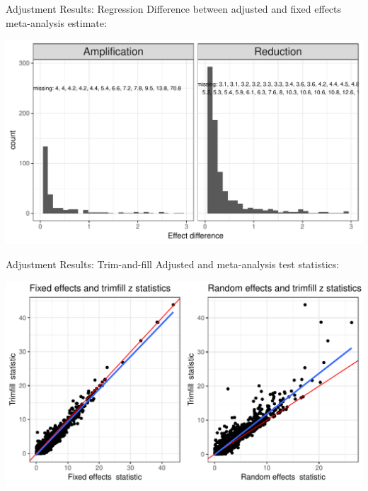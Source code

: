 \documentclass[english]{beamer}\usepackage[]{graphicx}\usepackage[]{color}
\makeatletter
\def\maxwidth{ %
  \ifdim\Gin@nat@width>\linewidth
    \linewidth
  \else
    \Gin@nat@width
  \fi
}
\newenvironment{knitrout}{}{} %
\makeatother
\begin{document}
\begin{frame}[fragile]{Adjustment Results: Regression}
Difference between adjusted and fixed effects meta-analysis estimate:

\vspace{-3mm}
\begin{knitrout}
\color{fgcolor}
\includegraphics[width=\maxwidth]{figure/unnamed-chunk-14-1} 

\end{knitrout}
\end{frame}

\begin{frame}[fragile]{Adjustment Results: Trim-and-fill}
Adjusted and meta-analysis test statistics:

\vspace{-3mm} 
\begin{knitrout}
\color{fgcolor}
\includegraphics[width=\maxwidth]{figure/unnamed-chunk-15-1} 

\end{knitrout}
\end{frame}
\end{document}
